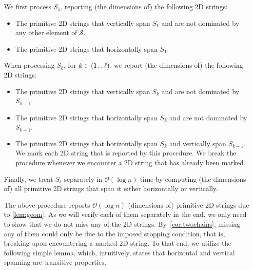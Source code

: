 \documentclass[11pt,letterpaper]{article}
\newcommand{\cO}{\mathcal{O}}
\def\dd{\mathinner{.\,.}}
\begin{document}
We first process $S_1$, reporting (the dimensions of) the following 2D strings:
\begin{itemize}
\item The primitive 2D strings that vertically span $S_1$ and are not dominated by any other element of $\mathcal{S}$.
\item The primitive 2D strings that horizontally span $S_1$.
\end{itemize}
When processing $S_k$, for $k \in (1 \dd \ell)$, we report (the dimensions of) the following 2D strings:
\begin{itemize}
\item The primitive 2D strings that vertically span $S_k$ and are not dominated by $S_{k+1}$.
\item The primitive 2D strings that horizontally span $S_k$ and are not dominated by $S_{k-1}$.
\item The primitive 2D strings that horizontally span $S_k$ and vertically span $S_{k-1}$. We mark each 2D string that is reported by this procedure. We break the procedure whenever we encounter a 2D string that has already been marked.
\end{itemize}
Finally, we treat $S_{\ell}$ separately in $\cO(\log n)$ time by computing (the dimensions of) all primitive 2D strings that span it either horizontally or vertically.

The above procedure reports $\cO(\log n)$ (dimensions of) primitive 2D strings due to \cref{lem:geom}.
As we will verify each of them separately in the end, we only need to show that we do not miss any of the 2D strings.
By~\cref{cor:twochains}, missing any of them could only be due to the imposed stopping condition, that is, breaking upon encountering a marked 2D string.
To that end, we utilize the following simple lemma, which,
intuitively, states that horizontal and vertical spanning are transitive properties.
\end{document}
